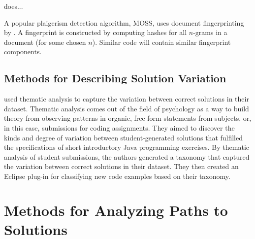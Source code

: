 \citet{tiarks2011extended} does... 

A popular plaigerism detection algorithm, MOSS, uses  document fingerprinting by \citet{schleimer2003winnowing}. A fingerprint is constructed by computing hashes for all $n$-grams in a document (for some chosen $n$). Similar code will contain similar fingerprint components. 


\subsection{Methods for Describing Solution Variation}

\begin{comment}
Braun and Clarke \cite{thematic06} argue that its application to qualitative data outside psychological research is justified. It is in direct contrast to methods in which a hypothesis or theory is first declared, and then evidence for and against it is gathered from the data. 
\end{comment}

\citet{Luxton13} used thematic analysis to capture the variation between correct solutions in their dataset. Thematic analysis comes out of the field of psychology as a way to build theory from observing patterns in organic, free-form statements from subjects, or, in this case, submissions for coding assignments. They aimed to discover the kinds and degree of variation between student-generated solutions that fulfilled the specifications of short introductory Java programming exercises. By thematic analysis of student submissions, the authors generated a taxonomy that captured the variation between correct solutions in their dataset. They then created an Eclipse plug-in for classifying new code examples based on their taxonomy. 

\section{Methods for Analyzing Paths to Solutions}

